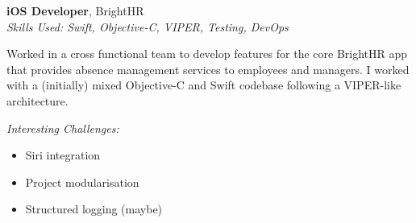 \textbf{iOS Developer}, BrightHR \\
\textit{Skills Used: Swift, Objective-C, VIPER, Testing, DevOps}

Worked in a cross functional team to develop features for the core BrightHR app
that provides absence management services to employees and managers. I worked
with a (initially) mixed Objective-C and Swift codebase following a VIPER-like
architecture.

\medskip

\textit{Interesting Challenges:}

\smallskip

\begin{itemize}
\item Siri integration

\item Project modularisation

\item Structured logging (maybe)

\end{itemize}

